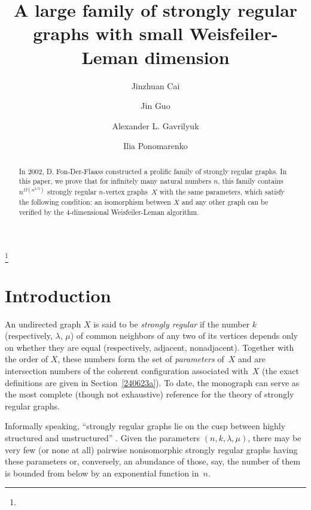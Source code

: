 \documentclass{amsart}
\begin{document}
\title[A large family of strongly regular graphs]{A large family of strongly regular graphs with small Weisfeiler-Leman dimension}

\author{Jinzhuan Cai}
\address{Hainan University, Haikou, China}
\author{Jin Guo}
\address{Hainan University, Haikou, China}
\author{Alexander L. Gavrilyuk}
\address{Shimane University, Matsue, Japan}
\author{Ilia Ponomarenko}
\address{Hainan University, Haikou, China; Steklov Institute of Mathematics at St. Petersburg, Russia}

\thanks{}
\date{}



\begin{abstract}
In 2002, D. Fon-Der-Flaass constructed a prolific family of strongly regular graphs. In this paper, we prove that for infinitely many 
natural numbers $n$, this family contains $n^{\mathsf{\Omega}(n^{2/3})}$ strongly 
regular $n$-vertex graphs~$X$ with the same parameters, which satisfy 
the following condition: an isomorphism between $X$ and any other 
graph can be verified by the $4$-dimensional Weisfeiler-Leman algorithm.
\end{abstract}


\maketitle

\section{Introduction}
An undirected graph $X$ is said to be \emph{strongly regular} if the number $k$ (respectively, $\lambda$, $\mu$) of common neighbors of any two of its vertices depends only on whether they are equal (respectively, adjacent, nonadjacent). Together with the order of $X$, these numbers form the set of \emph{parameters} of~$X$ and are intersection numbers of the coherent configuration associated with~$X$ (the exact definitions are given in Section~\ref{240623a}). To date, the monograph \cite{BrouwerM2022} can serve as 
the most complete (though not exhaustive) reference for 
the theory of strongly regular graphs.

Informally speaking, ``strongly regular graphs lie on the cusp 
between highly structured and unstructured'' \cite{Cameron}. 
Given the parameters $(n,k,\lambda,\mu)$, 
there may be very few (or none at all) pairwise nonisomorphic 
strongly regular graphs having these parameters or, conversely, 
an abundance of those, say, the number of them is bounded from 
below by an exponential function in~$n$.
\end{document}
